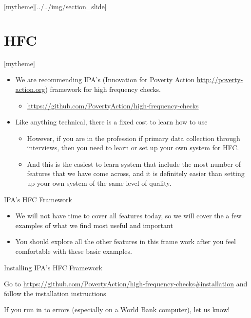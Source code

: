 \documentclass[aspectratio=169]{beamer}
\newcommand{\sectionpic}[2]{
	\setbeamertemplate{section page}[mytheme][#2]
	\section{#1}
	\setbeamertemplate{section page}[mytheme]
}
\begin{document}
\sectionpic{HFC}{../../img/section_slide}

\begin{frame}
	\begin{itemize}
		\item We are recommending IPA's (Innovation for Poverty Action \url{http://poverty-action.org}) framework for high frequency checks. 
		\begin{itemize}
			\item \url{https://github.com/PovertyAction/high-frequency-checks}
		\end{itemize}
		\item Like anything technical, there is a fixed cost to learn how to use
		\begin{itemize}
			\item However, if you are in the profession if primary data collection through interviews, then you need to learn or set up your own system for HFC. 
			\item And this is the easiest to learn system that include the most number of features that we have come across, and it is definitely easier than setting up your own system of the same level of quality.
		\end{itemize}
	\end{itemize}
\end{frame}

\begin{frame}{IPA's HFC Framework}
	\begin{itemize}
		\item We will not have time to cover all features today, so we will cover the a few examples of what we find most useful and important
		\item You should explore all the other features in this frame work after you feel comfortable with these basic examples.
	\end{itemize}
\end{frame}

\begin{frame}{Installing IPA's HFC Framework}

	Go to \url{https://github.com/PovertyAction/high-frequency-checks\#installation} and follow the installation instructions
	
	\vspace{.5cm}
	
	If you run in to errors (especially on a World Bank computer), let us know!

\end{frame}
\end{document}

